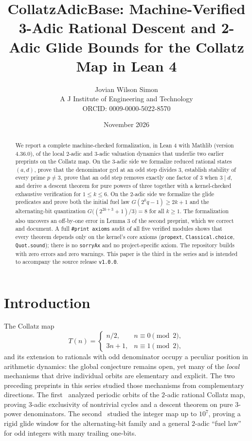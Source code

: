 \documentclass[11pt,a4paper]{article}
\title{\textbf{CollatzAdicBase: Machine-Verified 3-Adic Rational Descent and 2-Adic Glide Bounds for the Collatz Map in Lean 4}}
\author{Jovian Wilson Simon\\
A J Institute of Engineering and Technology\\
ORCID: 0009-0000-5022-8570}
\date{November 2026}
\begin{document}
\maketitle

\begin{abstract}
We report a complete machine-checked formalization, in Lean 4 with Mathlib
(version 4.36.0), of the local $2$-adic and $3$-adic valuation dynamics that
underlie two earlier preprints on the Collatz map.  On the $3$-adic side we
formalize reduced rational states $(a,d)$, prove that the denominator gcd at an
odd step divides $3$, establish stability of every prime $p\neq 3$, prove that
an odd step removes exactly one factor of $3$ when $3\mid d$, and derive a
descent theorem for pure powers of three together with a kernel-checked
exhaustive verification for $1\le k\le 6$.  On the $2$-adic side we formalize
the glide predicates and prove both the initial fuel law
$G(2^{k}q-1)\ge 2k+1$ and the alternating-bit quantization
$G\bigl((2^{2k+3}+1)/3\bigr)=8$ for all $k\ge 1$.  The formalization also
uncovers an off-by-one error in Lemma 3 of the second preprint, which we correct
and document.  A full \texttt{\#print axioms} audit of all five verified modules
shows that every theorem depends only on the kernel's core axioms
(\texttt{propext}, \texttt{Classical.choice}, \texttt{Quot.sound}); there is no
\texttt{sorryAx} and no project-specific axiom.  The repository builds with zero
errors and zero warnings.  This paper is the third in the series and is intended
to accompany the source release \texttt{v1.0.0}.
\end{abstract}

\section{Introduction}
\label{sec:intro}

The Collatz map
\[
  T(n)=\begin{cases}
    n/2, & n\equiv 0 \pmod 2,\\
    3n+1, & n\equiv 1 \pmod 2,
  \end{cases}
\]
and its extension to rationals with odd denominator occupy a peculiar position
in arithmetic dynamics: the global conjecture remains open, yet many of the
\emph{local} mechanisms that drive individual orbits are elementary and
explicit.  The two preceding preprints in this series studied those mechanisms
from complementary directions.  The first~\cite{paper1} analyzed periodic
orbits of the $2$-adic rational Collatz map, proving $3$-adic exclusivity of
nontrivial cycles and a descent theorem on pure $3$-power denominators.  The
second~\cite{paper2} studied the integer map up to $10^{7}$, proving a rigid
glide window for the alternating-bit family and a general $2$-adic ``fuel law''
for odd integers with many trailing one-bits.
\end{document}
